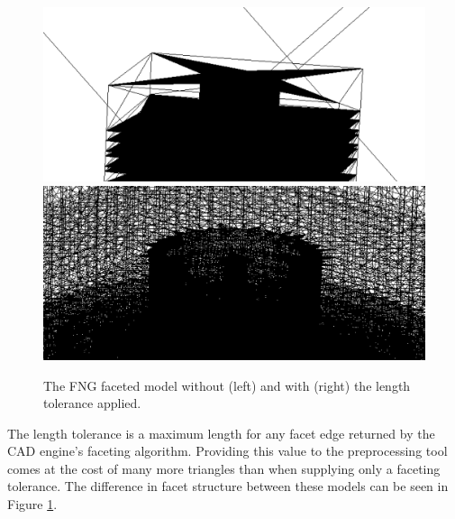 \documentclass[12pt, a4paper]{article}
\begin{document}
\begin{figure}[H]
  \small
  \begin{center}
    \includegraphics[scale=0.3, trim = 200 0 100 0]{fng_facet_tol.png}
    \includegraphics[scale=0.25]{fng_len_tol.png}
    \caption{The FNG faceted model without (left) and with (right) the length tolerance applied.}
    \label{fng-faceted-models}
  \end{center}
\end{figure}

The length tolerance is a maximum length for any facet edge returned by the CAD engine's faceting algorithm. Providing this value to the preprocessing tool comes at the cost of many more triangles than when supplying only a faceting tolerance. The difference in facet structure between these models can be seen in Figure \ref{fng-faceted-models}.
\end{document}
